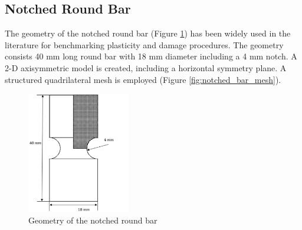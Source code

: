 \documentclass[sn-mathphys,Numbered,draft]{sn-jnl}%
\begin{document}
\subsection{Notched Round Bar}
The geometry of the notched round bar (Figure \ref{fig:notched_bar_geom}) has been widely used in the literature \cite{cesar_de_sa_damage_2006, fincato_return_2018, vaz_aspects_2001} for benchmarking plasticity and damage procedures.
The geometry consists 40 \si{\milli\meter} long round bar with 18 \si{\milli\meter} diameter including a 4 \si{\milli\meter} notch.
A 2-D axisymmetric model is created, including a horizontal symmetry plane.
A structured quadrilateral mesh is employed (Figure \ref{fig:notched_bar_mesh}).

\begin{figure}[htb] \label{fig:notched_bar_geom}
\begin{center}
	\includegraphics[width=0.4\textwidth]{./Figures/finiteVolumeImplementation/inhomogenousDeformation/axiNotchedCase.png}
\caption{Geometry of the notched round bar}
\end{center}
\end{figure}
\end{document}
